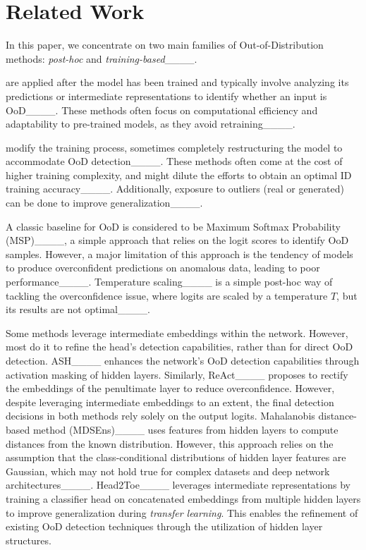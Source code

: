 \section{Related Work}
\label{sec:related}
In this paper, we concentrate on two main families of Out-of-Distribution methods: \textit{post-hoc} and \textit{training-based}____.

 are applied after the model has been trained and typically involve analyzing its predictions or intermediate representations to identify whether an input is OoD____. These methods often focus on computational efficiency and adaptability to pre-trained models, as they avoid retraining____.

 modify the training process, sometimes completely restructuring the model to accommodate OoD detection____. These methods often come at the cost of higher training complexity, and might dilute the efforts to obtain an optimal ID training accuracy____. Additionally, exposure to outliers (real or generated) can be done to improve generalization____.

A classic baseline for OoD is considered to be Maximum Softmax Probability (MSP)____, a simple approach that relies on the logit scores to identify OoD samples. However, a major limitation of this approach is the tendency of models to produce overconfident predictions on anomalous data, leading to poor performance____. Temperature scaling____ is a simple post-hoc way of tackling the overconfidence issue, where logits are scaled by a temperature $T$, but its results are not optimal____.

Some methods leverage intermediate embeddings within the network. However, most do it to refine the head's detection capabilities, rather than for direct OoD detection. ASH____ enhances the network's OoD detection capabilities through activation masking of hidden layers. Similarly, ReAct____ proposes to rectify the embeddings of the penultimate layer to reduce overconfidence. However, despite leveraging intermediate embeddings to an extent, the final detection decisions in both methods rely solely on the output logits. Mahalanobis distance-based method (MDSEns)____ uses features from hidden layers to compute distances from the known distribution. However, this approach relies on the assumption that the class-conditional distributions of hidden layer features are Gaussian, which may not hold true for complex datasets and deep network architectures____. Head2Toe____ leverages intermediate representations by training a classifier head on concatenated embeddings from multiple hidden layers to improve generalization during \textit{transfer learning}. This enables the refinement of existing OoD detection techniques through the utilization of hidden layer structures.